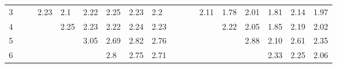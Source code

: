\documentclass[a4paper, 10pt, ngerman]{article}
\begin{document}
\begin{figure}
\begin{tabular}{c|p{\colwidth}p{\colwidth}p{\colwidth}p{\colwidth}p{\colwidth}p{\colwidth}p{\colwidth}p{\colwidth}c|p{\colwidth}p{\colwidth}p{\colwidth}p{\colwidth}p{\colwidth}p{\colwidth}p{\colwidth}p{\colwidth}}
        3 &                                   &                                    & \textcolor[HTML]{ 90206e }{ 2.23 } & \textcolor[HTML]{ 81207d }{ 2.1 }  & \textcolor[HTML]{ 90206e }{ 2.22 } & \textcolor[HTML]{ 93206b }{ 2.25 } & \textcolor[HTML]{ 91206d }{ 2.23 } & \textcolor[HTML]{ 8d2071 }{ 2.2 }  & \space &                                    &                                    & \textcolor[HTML]{ 752089 }{ 2.11 } & \textcolor[HTML]{ 5220ac }{ 1.78 } & \textcolor[HTML]{ 6a2094 }{ 2.01 } & \textcolor[HTML]{ 5620a8 }{ 1.81 } & \textcolor[HTML]{ 772087 }{ 2.14 } & \textcolor[HTML]{ 662098 }{ 1.97 } \\
        4 &                                   &                                    &                                    & \textcolor[HTML]{ 93206b }{ 2.25 } & \textcolor[HTML]{ 91206d }{ 2.23 } & \textcolor[HTML]{ 90206e }{ 2.22 } & \textcolor[HTML]{ 92206c }{ 2.24 } & \textcolor[HTML]{ 90206e }{ 2.23 } & \space &                                    &                                    &                                    & \textcolor[HTML]{ 80207e }{ 2.22 } & \textcolor[HTML]{ 6f208f }{ 2.05 } & \textcolor[HTML]{ 5920a5 }{ 1.85 } & \textcolor[HTML]{ 7d2081 }{ 2.19 } & \textcolor[HTML]{ 6b2093 }{ 2.02 } \\
        5 &                                   &                                    &                                    &                                    & \textcolor[HTML]{ f1200d }{ 3.05 } & \textcolor[HTML]{ c62038 }{ 2.69 } & \textcolor[HTML]{ d62028 }{ 2.82 } & \textcolor[HTML]{ ce2030 }{ 2.76 } & \space &                                    &                                    &                                    &                                    & \textcolor[HTML]{ c62038 }{ 2.88 } & \textcolor[HTML]{ 74208a }{ 2.10 } & \textcolor[HTML]{ a92055 }{ 2.61 } & \textcolor[HTML]{ 8e2070 }{ 2.35 } \\
        6 &                                   &                                    &                                    &                                    &                                    & \textcolor[HTML]{ d3202b }{ 2.8 }  & \textcolor[HTML]{ cd2031 }{ 2.75 } & \textcolor[HTML]{ c92035 }{ 2.71 } & \space &                                    &                                    &                                    &                                    &                                    & \textcolor[HTML]{ 8c2072 }{ 2.33 } & \textcolor[HTML]{ 83207b }{ 2.25 } & \textcolor[HTML]{ 70208e }{ 2.06 } \\

\end{tabular}
\end{figure}
\end{document}
